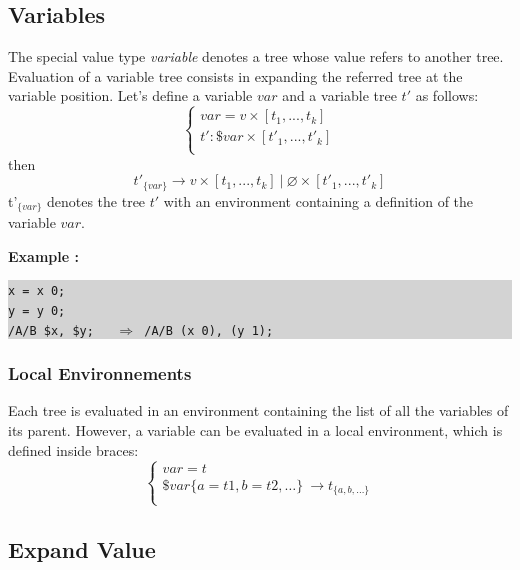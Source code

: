 \documentclass[runningheads,a4paper]{llncs}
\newcommand{\exemple}	{\vspace*{1mm}\hspace*{-4mm}\textbf{Example :}}
\newcommand{\code}	[2][0.9]	{\vspace{0mm}\begin{center}\colorbox{lightgrey}{
							\begin{minipage}[t]{#1\columnwidth} 
							{\small \texttt{#2}}
							\end{minipage}}\end{center}}
\newcommand{\llist}	[1]		{\ensuremath{[#1_1,...,#1_k]}}
\newcommand{\seq}		{\ensuremath{|}}
\newcommand{\forest}	{\ensuremath{\varnothing}}
\newcommand{\etc}		{\ensuremath{\text{…}}}
\begin{document}
\subsection{Variables}
The special value type \emph{variable} denotes a tree whose value refers to another tree.
Evaluation of a variable tree consists in expanding the referred tree at the variable position.
Let's define a variable $var$ and a variable tree $t'$ as follows:
\[
\left\{
\begin{array}{l}
	var = v \times \llist{t} \\
	t' : \$var \times \llist{t'}\\
\end{array}
\right.
\]
then 
\[
	t'_{\{var\}}  \to v \times \llist{t}\ \seq\ \forest \times \llist{t'}
\]
t'$_{\{var\}}$ denotes the tree $t'$ with an environment containing a definition of the variable $var$.

\exemple
\code{x = x 0;\\
y = y 0;\\
/A/B \$x, \$y; \ \ $\Rightarrow$  /A/B (x 0), (y 1);}


\subsubsection{Local Environnements}

Each tree is evaluated in an environment containing the list of all the variables of its parent. However, a variable can be evaluated in a local environment, which is defined inside braces:
\[
\left\{
\begin{array}{l}
	var = t \\
	\$var\{a=t1, b=t2,\etc\} \ \to  t_{\{a, b,\etc\}} \\
\end{array}
\right.
\]


\subsection{Expand Value}
\end{document}
